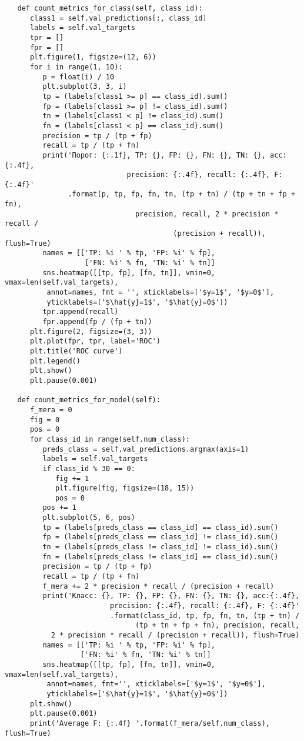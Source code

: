 \begin{verbatim}
   def count_metrics_for_class(self, class_id):
      class1 = self.val_predictions[:, class_id]
      labels = self.val_targets
      tpr = []
      fpr = []
      plt.figure(1, figsize=(12, 6))
      for i in range(1, 10):
         p = float(i) / 10
         plt.subplot(3, 3, i)
         tp = (labels[class1 >= p] == class_id).sum()
         fp = (labels[class1 >= p] != class_id).sum()
         tn = (labels[class1 < p] != class_id).sum()
         fn = (labels[class1 < p] == class_id).sum()
         precision = tp / (tp + fp)
         recall = tp / (tp + fn)
         print('Порог: {:.1f}, TP: {}, FP: {}, FN: {}, TN: {}, acc:{:.4f},
                             precision: {:.4f}, recall: {:.4f}, F: {:.4f}'
               .format(p, tp, fp, fn, tn, (tp + tn) / (tp + tn + fp + fn),
                               precision, recall, 2 * precision * recall /
                                        (precision + recall)), flush=True)
         names = [['TP: %i ' % tp, 'FP: %i' % fp], 
                   ['FN: %i' % fn, 'TN: %i' % tn]]
         sns.heatmap([[tp, fp], [fn, tn]], vmin=0, vmax=len(self.val_targets),
          annot=names, fmt = '', xticklabels=['$y=1$', '$y=0$'],
          yticklabels=['$\hat{y}=1$', '$\hat{y}=0$'])
         tpr.append(recall)
         fpr.append(fp / (fp + tn))
      plt.figure(2, figsize=(3, 3))
      plt.plot(fpr, tpr, label='ROC')
      plt.title('ROC curve')
      plt.legend()
      plt.show()
      plt.pause(0.001)

   def count_metrics_for_model(self):
      f_mera = 0
      fig = 0
      pos = 0
      for class_id in range(self.num_class):
         preds_class = self.val_predictions.argmax(axis=1)
         labels = self.val_targets
         if class_id % 30 == 0:
            fig += 1
            plt.figure(fig, figsize=(18, 15))
            pos = 0
         pos += 1
         plt.subplot(5, 6, pos)
         tp = (labels[preds_class == class_id] == class_id).sum()
         fp = (labels[preds_class == class_id] != class_id).sum()
         tn = (labels[preds_class != class_id] != class_id).sum()
         fn = (labels[preds_class != class_id] == class_id).sum()
         precision = tp / (tp + fp)
         recall = tp / (tp + fn)
         f_mera += 2 * precision * recall / (precision + recall)
         print('Класс: {}, TP: {}, FP: {}, FN: {}, TN: {}, acc:{:.4f},
                         precision: {:.4f}, recall: {:.4f}, F: {:.4f}'
                         .format(class_id, tp, fp, fn, tn, (tp + tn) /
                               (tp + tn + fp + fn), precision, recall,
           2 * precision * recall / (precision + recall)), flush=True)
         names = [['TP: %i ' % tp, 'FP: %i' % fp],
                  ['FN: %i' % fn, 'TN: %i' % tn]]
         sns.heatmap([[tp, fp], [fn, tn]], vmin=0, vmax=len(self.val_targets),
          annot=names, fmt='', xticklabels=['$y=1$', '$y=0$'],
          yticklabels=['$\hat{y}=1$', '$\hat{y}=0$'])
      plt.show()
      plt.pause(0.001)
      print('Average F: {:.4f} '.format(f_mera/self.num_class), flush=True)


\end{verbatim}
